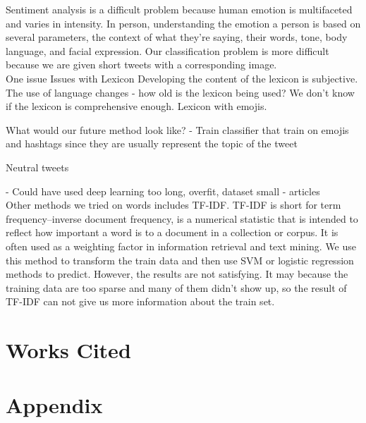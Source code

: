 \documentclass[]{article}
\begin{document}
Sentiment analysis is a difficult problem because human emotion is multifaceted and varies in intensity. In person, understanding the emotion a person is based on several parameters, the context of what they're saying, their words, tone, body language, and facial expression. Our classification problem is more difficult because we are given short tweets with a corresponding image. \\

One issue 
Issues with Lexicon
Developing the content of the lexicon is subjective. The use of language changes - how old is the lexicon being used? We don't know if the lexicon is comprehensive enough. Lexicon with emojis. 

What would our future method look like?
- Train classifier that train on emojis and hashtags since they are usually represent the topic of the tweet


Neutral tweets 


- Could have used deep learning 
	too long, overfit, dataset small
- articles \\
Other methods we tried on words includes TF-IDF. TF-IDF is short for term frequency–inverse document frequency, is a numerical statistic that is intended to reflect how important a word is to a document in a collection or corpus. It is often used as a weighting factor in information retrieval and text mining. We use this method to transform the train data and then use SVM or logistic regression methods to predict. However, the results are not satisfying. It may because the training data are too sparse and many of them didn't show up, so the result of TF-IDF can not give us more information about the train set.

\section{Works Cited}
\begin{thebibliography}{1}


\end{thebibliography}

\section{Appendix}


\end{document}
